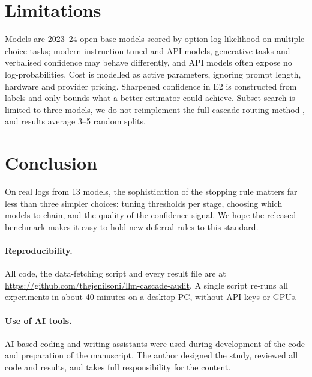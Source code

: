 \documentclass[10pt,twocolumn]{article}
\newcommand{\repourl}{\url{https://github.com/thejenilsoni/llm-cascade-audit}}
\begin{document}
\section{Limitations}
Models are 2023--24 open base models scored by option log-likelihood on multiple-choice tasks; modern
instruction-tuned and API models, generative tasks and verbalised confidence may behave differently,
and API models often expose no log-probabilities. Cost is modelled as active parameters, ignoring
prompt length, hardware and provider pricing. Sharpened confidence in E2 is constructed from labels
and only bounds what a better estimator could achieve. Subset search is limited to three models, we
do not reimplement the full cascade-routing method \cite{dekoninck2025}, and results average 3--5
random splits.

\section{Conclusion}
On real logs from 13 models, the sophistication of the stopping rule matters far less than three
simpler choices: tuning thresholds per stage, choosing which models to chain, and the quality of the
confidence signal. We hope the released benchmark makes it easy to hold new deferral rules to this
standard.

\paragraph{Reproducibility.} All code, the data-fetching script and every result file are at
\repourl. A single script re-runs all experiments in about 40 minutes on a desktop PC, without API keys or GPUs.

\paragraph{Use of AI tools.} AI-based coding and writing assistants were used during development of
the code and preparation of the manuscript. The author designed the study, reviewed all code and
results, and takes full responsibility for the content.
\end{document}
